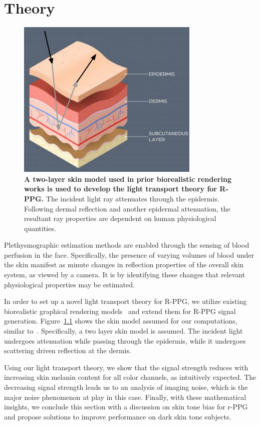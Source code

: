 %
%

\chapter{Theory}

\begin{figure}[t]
    \centering
    \includegraphics[height=3in]{include/fig_skin.pdf}
    \caption{\textbf{A two-layer skin model used in prior biorealistic rendering works is used to develop the light transport theory for R-PPG.} The incident light ray attenuates through the epidermis. Following dermal reflection and another epidermal attenuation, the resultant ray properties are dependent on human physiological quantities.}
    \label{fig:skin_model}
\end{figure}

Plethysmographic estimation methods are enabled through the sensing of blood perfusion in the face. Specifically, the presence of varying volumes of blood under the skin manifest as minute changes in reflection properties of the overall skin system, as viewed by a camera. It is by identifying these changes that relevant physiological properties may be estimated. 

In order to set up a novel light transport theory for R-PPG, we utilize existing biorealistic graphical rendering models~\cite{} and extend them for R-PPG signal generation. Figure~\ref{fig:skin_model} shows the skin model assumed for our computations, similar to~\cite{alotaibi_biophysical_2017}. Specifically, a two layer skin model is assumed. The incident light undergoes attenuation while passing through the epidermis, while it undergoes scattering driven reflection at the dermis. 

Using our light transport theory, we show that the signal strength reduces with increasing skin melanin content for all color channels, as intuitively expected. The decreasing signal strength leads us to an analysis of imaging noise, which is the major noise phenomenon at play in this case. Finally, with these mathematical insights, we conclude this section with a discussion on skin tone bias for r-PPG and propose solutions to improve performance on dark skin tone subjects.  

